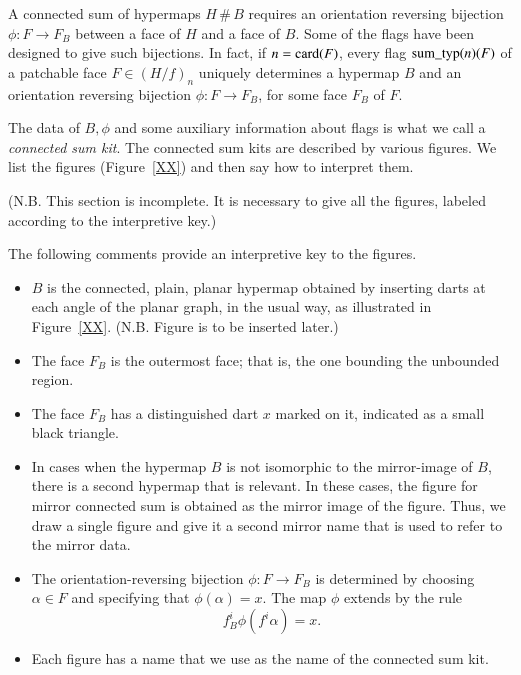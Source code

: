 A connected sum of hypermaps $H\,\#\,B$  requires an
orientation reversing bijection $\phi:F\to F_B$ between a face of
$H$ and a face of $B$.  Some of the flags have been designed to
give such bijections.  In fact,  if $n={\operatorname{card}}(F)$, every flag
${\operatorname{sum\_typ}}(n)(F)$ of a patchable face $F\in (H/f)_{n}$
uniquely determines a hypermap $B$ and an orientation reversing
bijection $\phi:F\to F_B$, for some face $F_B$ of $F$.

The data of $B,\phi$ and some auxiliary information about flags is
what we call a {\it connected sum kit}.  The connected sum kits are described by
various figures.  We list the figures (Figure~\ref{XX}) and then
say how to interpret them.

(N.B. This section is incomplete.  It is necessary to give all the
figures, labeled according to the interpretive key.)

The following comments provide an interpretive key to the
figures.
\begin{itemize}
    \item $B$ is the connected, plain, planar
    hypermap obtained by inserting darts at each angle of the
    planar graph, in the usual way, as illustrated in
    Figure~\ref{XX}.%
    (N.B. Figure is to be inserted later.)
    \item The face $F_B$ is the outermost face; that is, the one
    bounding the unbounded region.
    \item The face $F_B$ has a distinguished dart $x$ marked on it,
    indicated as a small black triangle.
    \item In cases when the hypermap $B$ is not isomorphic to the
    mirror-image of $B$, there is a second hypermap that is
    relevant. In these cases, the figure for mirror 
    connected sum is obtained as the
    mirror image of the figure.  Thus, we draw a single figure
    and give it a second mirror name that is used to refer to the
    mirror data.
    \item The orientation-reversing bijection $\phi:F\to F_B$ is
    determined by choosing $\alpha\in F$ and specifying that
    $\phi(\alpha) =x$.  The map $\phi$ extends by the rule
        $$f_B^i\phi(f^i\alpha ) = x.$$
    \item Each figure has a name that we use as the name of the connected sum kit.
\end{itemize}

